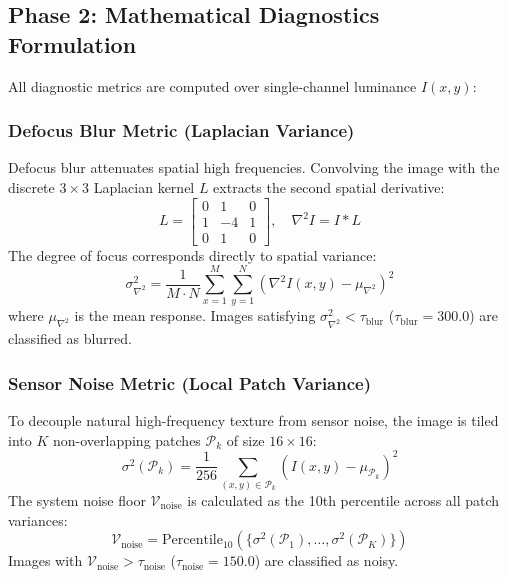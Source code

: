 \documentclass[conference]{IEEEtran}
\begin{document}
\subsection{Phase 2: Mathematical Diagnostics Formulation}
All diagnostic metrics are computed over single-channel luminance $I(x,y)$:

\subsubsection{Defocus Blur Metric (Laplacian Variance)}
Defocus blur attenuates spatial high frequencies. Convolving the image with the discrete $3 \times 3$ Laplacian kernel $L$ extracts the second spatial derivative:
\begin{equation}
L = \begin{bmatrix} 0 & 1 & 0 \\ 1 & -4 & 1 \\ 0 & 1 & 0 \end{bmatrix}, \quad \nabla^2 I = I * L
\end{equation}
The degree of focus corresponds directly to spatial variance:
\begin{equation}
\sigma_{\nabla^2}^2 = \frac{1}{M \cdot N} \sum_{x=1}^{M} \sum_{y=1}^{N} \left( \nabla^2 I(x,y) - \mu_{\nabla^2} \right)^2
\end{equation}
where $\mu_{\nabla^2}$ is the mean response. Images satisfying $\sigma_{\nabla^2}^2 < \tau_{\text{blur}}$ ($\tau_{\text{blur}} = 300.0$) are classified as blurred.

\subsubsection{Sensor Noise Metric (Local Patch Variance)}
To decouple natural high-frequency texture from sensor noise, the image is tiled into $K$ non-overlapping patches $\mathcal{P}_k$ of size $16 \times 16$:
\begin{equation}
\sigma^2(\mathcal{P}_k) = \frac{1}{256} \sum_{(x,y) \in \mathcal{P}_k} \left( I(x,y) - \mu_{\mathcal{P}_k} \right)^2
\end{equation}
The system noise floor $\mathcal{V}_{\text{noise}}$ is calculated as the 10th percentile across all patch variances:
\begin{equation}
\mathcal{V}_{\text{noise}} = \text{Percentile}_{10}\left( \{\sigma^2(\mathcal{P}_1), \dots, \sigma^2(\mathcal{P}_K)\} \right)
\end{equation}
Images with $\mathcal{V}_{\text{noise}} > \tau_{\text{noise}}$ ($\tau_{\text{noise}} = 150.0$) are classified as noisy.
\end{document}
